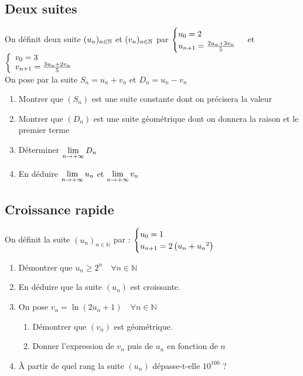 \documentclass[oneside,12pt]{book}          %
\begin{document}
\subsection{Deux suites}
On définit deux suite ${(u_{n})_{n\in\mathbb N}}$ et $(v_n)_{{n\in\mathbb N}}$ par $\defsuite{u_0=2}{\frac{2u_n+3v_n}{5}}$ et $\accol{v_0=3\\v_{n+1}=\frac{3u_n+2v_n}{5}}$\\
On pose par la suite $S_n=u_n+v_n$ et $D_n=u_n-v_n$
\begin{enumerate}
    \item Montrer que $(S_n)$ est une suite constante dont on précisera la valeur
    \item Montrer que $(D_n)$ est une suite géométrique dont on donnera la raison et le premier terme
    \item Déterminer ${\lim\limits_{n\to +\infty}}\, D_n$
    \item En déduire ${\lim\limits_{n\to +\infty}}\, u_n$ et ${\lim\limits_{n\to +\infty}}\, v_n$
\end{enumerate}



\subsection{Croissance rapide}
On définit la suite $(u_n)_{n \in \mathbb{N}}$ par : $\defsuite{u_0=1}{2\left(u_n+{u_n}^2\right)}$
\begin{enumerate}
    \item Démontrer que $u_n \geq 2^n \quad \forall n \in \mathbb{N}$
    \item En déduire que la suite $(u_n)$ est croissante.
    \item On pose $v_n = \ln(2u_n + 1) \quad \forall n \in \mathbb{N}$
    \begin{enumerate}
        \item Démontrer que $(v_n)$ est géométrique.
        \item Donner l'expression de $v_n$ puis de $u_n$ en fonction de $n$
    \end{enumerate}
    \item À partir de quel rang la suite $(u_n)$ dépasse-t-elle $10^{100}$ ?
\end{enumerate}
\end{document}
